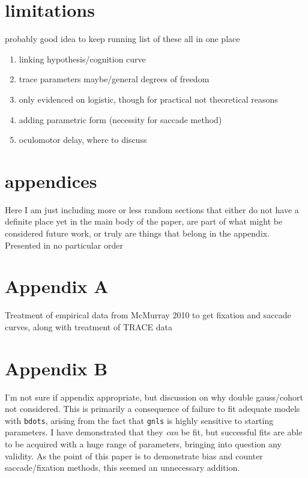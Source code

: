 \documentclass{article}
\newcommand{\xt}{\texttt}%
\begin{document}
\section{limitations}

probably good idea to keep running list of these all in one place

\begin{singlespace}
\begin{enumerate}
\item linking hypothesis/cognition curve
\item trace parameters maybe/general degrees of freedom
\item only evidenced on logistic, though for practical not theoretical reasons
\item adding parametric form (necessity for saccade method)
\item oculomotor delay, where to discuss
\end{enumerate}
\end{singlespace}


\section{appendices}

Here  I am just including more or less random sections that either do not have a definite place yet in the main body of the paper, are part of what might be considered future work, or truly are things that belong in the appendix. Presented in no particular order

\section*{Appendix A}

Treatment of empirical data from McMurray 2010 to get fixation and saccade curves,  along with treatment of TRACE data

\section*{Appendix B}

I'm not sure if appendix appropriate, but discussion on why double gauss/cohort not considered. This is primarily a consequence of failure to fit adequate models with \xt{bdots}, arising from the fact that \xt{gnls} is highly sensitive to starting parameters. I have demonstrated that they \textit{can} be fit, but successful fits are able to be acquired with a huge range of parameters, bringing into question any validity. As the point of this paper is to demonstrate bias and counter saccade/fixation methods, this seemed an unnecessary addition.
\end{document}
